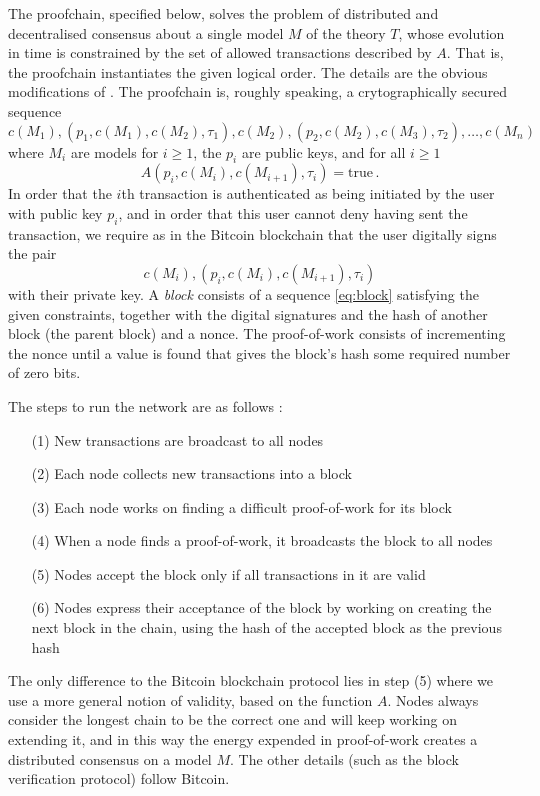 \documentclass[english,letter paper,12pt,reqno]{article}
\theoremstyle{example}
\begin{document}
The proofchain, specified below, solves the problem of distributed and decentralised consensus about a single model $M$ of the theory $T$, whose evolution in time is constrained by the set of allowed transactions described by $A$. That is, the proofchain instantiates the given logical order. The details are the obvious modifications of \cite{satoshi}. The proofchain is, roughly speaking, a crytographically secured sequence
\begin{equation}\label{eq:block}
c(M_1), (p_1, c(M_1), c(M_2), \tau_1), c(M_2), (p_2, c(M_2),c(M_3),\tau_2), \ldots, c(M_n)
\end{equation}
where $M_i$ are models for $i \ge 1$, the $p_i$ are public keys, and for all $i \ge 1$
\[
A(p_i, c(M_i), c(M_{i+1}), \tau_i) = \textrm{true}\,.
\]
In order that the $i$th transaction is authenticated as being initiated by the user with public key $p_i$, and in order that this user cannot deny having sent the transaction, we require as in the Bitcoin blockchain that the user digitally signs the pair
\[
c(M_i), (p_i, c(M_i), c(M_{i+1}), \tau_i)
\]
with their private key. A \emph{block} consists of a sequence \eqref{eq:block} satisfying the given constraints, together with the digital signatures and the hash of another block (the parent block) and a nonce. The proof-of-work consists of incrementing the nonce until a value is found that gives the block's hash some required number of zero bits.

The steps to run the network are as follows \cite[\S 5]{satoshi}:
\begin{itemize}
\item[(1)] New transactions are broadcast to all nodes
\item[(2)] Each node collects new transactions into a block
\item[(3)] Each node works on finding a difficult proof-of-work for its block
\item[(4)] When a node finds a proof-of-work, it broadcasts the block to all nodes
\item[(5)] Nodes accept the block only if all transactions in it are valid
\item[(6)] Nodes express their acceptance of the block by working on creating the next block in the chain, using the hash of the accepted block as the previous hash
\end{itemize}
The only difference to the Bitcoin blockchain protocol lies in step (5) where we use a more general notion of validity, based on the function $A$. Nodes always consider the longest chain to be the correct one and will keep working on extending it, and in this way the energy expended in proof-of-work creates a distributed consensus on a model $M$. The other details (such as the block verification protocol) follow Bitcoin.
\vspace{0.2cm}
\end{document}
